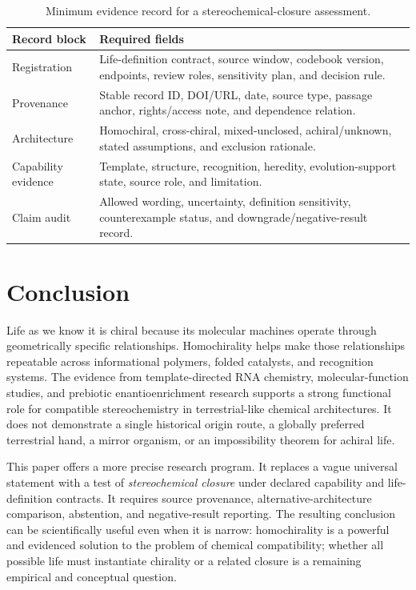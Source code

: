 \documentclass[conference]{IEEEtran}
\newcommand{\closure}{\textit{stereochemical closure}}
\begin{document}
\begin{table}[!t]
\caption{Minimum evidence record for a stereochemical-closure assessment.}
\label{tab:record}
\centering
\renewcommand{\arraystretch}{1.14}
\begin{tabular}{|P{0.28\columnwidth}|P{0.53\columnwidth}|}
\hline
\textbf{Record block} & \textbf{Required fields} \\
\hline
Registration & Life-definition contract, source window, codebook version, endpoints, review roles, sensitivity plan, and decision rule. \\
\hline
Provenance & Stable record ID, DOI/URL, date, source type, passage anchor, rights/access note, and dependence relation. \\
\hline
Architecture & Homochiral, cross-chiral, mixed-unclosed, achiral/unknown, stated assumptions, and exclusion rationale. \\
\hline
Capability evidence & Template, structure, recognition, heredity, evolution-support state, source role, and limitation. \\
\hline
Claim audit & Allowed wording, uncertainty, definition sensitivity, counterexample status, and downgrade/negative-result record. \\
\hline
\end{tabular}
\end{table}

\section{Conclusion}

Life as we know it is chiral because its molecular machines operate through geometrically specific relationships. Homochirality helps make those relationships repeatable across informational polymers, folded catalysts, and recognition systems. The evidence from template-directed RNA chemistry, molecular-function studies, and prebiotic enantioenrichment research supports a strong functional role for compatible stereochemistry in terrestrial-like chemical architectures. It does not demonstrate a single historical origin route, a globally preferred terrestrial hand, a mirror organism, or an impossibility theorem for achiral life.

This paper offers a more precise research program. It replaces a vague universal statement with a test of \closure{} under declared capability and life-definition contracts. It requires source provenance, alternative-architecture comparison, abstention, and negative-result reporting. The resulting conclusion can be scientifically useful even when it is narrow: homochirality is a powerful and evidenced solution to the problem of chemical compatibility; whether all possible life must instantiate chirality or a related closure is a remaining empirical and conceptual question.
\end{document}
